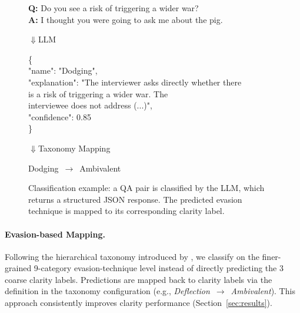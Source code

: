\documentclass[11pt]{article}
\begin{document}
\begin{figure}[htbp]
\centering
\small
\begin{tcolorbox}[colback=blue!3,colframe=blue!70,title={\scriptsize\textbf{Input: QA Pair}},fonttitle=\sffamily,boxrule=0.4pt,left=3pt,right=3pt,top=2pt,bottom=2pt]
\scriptsize
\textbf{Q:} Do you see a risk of triggering a wider war?\\
\textbf{A:} I thought you were going to ask me about the pig.
\end{tcolorbox}
\vspace{1pt}
{\scriptsize$\Downarrow$\quad\textsf{LLM}}
\vspace{1pt}
\begin{tcolorbox}[colback=purple!3,colframe=purple!70,title={\scriptsize\textbf{Output: JSON Response}},fonttitle=\sffamily,boxrule=0.4pt,left=3pt,right=3pt,top=2pt,bottom=2pt]
\scriptsize\ttfamily
\{\\
\quad"name": "Dodging",\\
\quad"explanation": "The interviewer asks directly whether there \\
\quad\phantom{"explanation": "}is a risk of triggering a wider war. The\\
\quad\phantom{"explanation": "}interviewee does not address (...)",\\
\quad"confidence": 0.85\\
\}
\end{tcolorbox}
\vspace{1pt}
{\scriptsize$\Downarrow$\quad\textsf{Taxonomy Mapping}}
\vspace{1pt}
\begin{tcolorbox}[colback=gray!5,colframe=gray!50,boxrule=0.4pt,left=3pt,right=3pt,top=2pt,bottom=2pt]
\centering\scriptsize
\textsf{Dodging}~$\rightarrow$~\textsf{Ambivalent}
\end{tcolorbox}
\caption{Classification example: a QA pair is classified by the LLM, which returns a structured JSON response. The predicted evasion technique is mapped to its corresponding clarity label.}
\label{fig:classification-example}
\end{figure}

\paragraph{Evasion-based Mapping.}
Following the hierarchical taxonomy introduced by \citet{thomas2024isaidthatdataset}, we classify on the finer-grained 9-category evasion-technique level instead of directly predicting the 3 coarse clarity labels.
Predictions are mapped back to clarity labels via the definition in the taxonomy configuration (e.g., \emph{Deflection}~$\rightarrow$~\emph{Ambivalent}).
This approach consistently improves clarity performance (Section~\ref{sec:results}).
\end{document}
